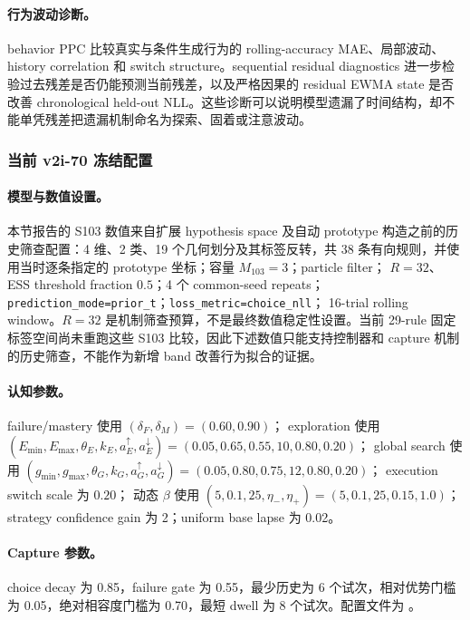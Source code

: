 \paragraph{行为波动诊断。}
behavior PPC 比较真实与条件生成行为的 rolling-accuracy MAE、局部波动、history correlation 和 switch structure。sequential residual diagnostics 进一步检验过去残差是否仍能预测当前残差，以及严格因果的 residual EWMA state 是否改善 chronological held-out NLL。这些诊断可以说明模型遗漏了时间结构，却不能单凭残差把遗漏机制命名为探索、固着或注意波动。


\subsubsection{当前 v2i-70 冻结配置}

\paragraph{模型与数值设置。}
本节报告的 S103 数值来自扩展 hypothesis space 及自动 prototype 构造之前的历史筛查配置：4 维、2 类、19 个几何划分及其标签反转，共 38 条有向规则，并使用当时逐条指定的 prototype 坐标；容量 $M_{103}=3$；particle filter；
$R=32$、ESS threshold fraction $0.5$；4 个 common-seed repeats；
\texttt{prediction\_mode=prior\_t}；\texttt{loss\_metric=choice\_nll}；
16-trial rolling window。$R=32$ 是机制筛查预算，不是最终数值稳定性设置。当前 29-rule 固定标签空间尚未重跑这些 S103 比较，因此下述数值只能支持控制器和 capture 机制的历史筛查，不能作为新增 band 改善行为拟合的证据。

\paragraph{认知参数。}
failure/mastery 使用 $(\delta_F,\delta_M)=(0.60,0.90)$；
exploration 使用
$(E_{\min},E_{\max},\theta_E,k_E,a_E^\uparrow,a_E^\downarrow)
=(0.05,0.65,0.55,10,0.80,0.20)$；
global search 使用
$(g_{\min},g_{\max},\theta_G,k_G,a_G^\uparrow,a_G^\downarrow)
=(0.05,0.80,0.75,12,0.80,0.20)$；
execution switch scale 为 $0.20$；
动态 $\beta$ 使用
$(5,0.1,25,\eta_-,\eta_+)=(5,0.1,25,0.15,1.0)$；
strategy confidence gain 为 2；uniform base lapse 为 0.02。

\paragraph{Capture 参数。}
choice decay 为 0.85，failure gate 为 0.55，最少历史为 6 个试次，相对优势门槛为 0.05，绝对相容度门槛为 0.70，最短 dwell 为 8 个试次。配置文件为
。


